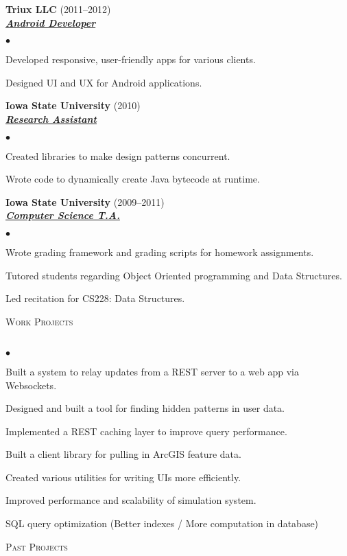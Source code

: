 \documentclass{article}
\newcommand{\lineunder} {
	\vspace*{-8pt} \\ \hspace*{-18pt} \hrulefill \\
}
\newcommand{\header}[1] {
	{\hspace*{-15pt}\vspace*{6pt} \textsc{#1}} \vspace*{-6pt} \lineunder
}
\newcommand{\employer}[3] {
	{ \textbf{#1} (#2)\\ \underline{\textbf{\emph{#3}}}\\  }
}
\newenvironment{achievements} {
	\begin{list}{$\bullet$}
		{\topsep 0pt \itemsep -2pt}
	}{
		\vspace*{4pt}\end{list}
	}
\begin{document}
	\employer{Triux LLC}{2011--2012}{Android Developer}
		\begin{achievements}
			\item{Developed responsive, user-friendly apps for various clients.}
			\item{Designed UI and UX for Android applications.}
		\end{achievements}

	\employer{Iowa State University}{2010}{Research Assistant}
		\begin{achievements}
			\item{Created libraries to make design patterns concurrent.}
			\item{Wrote code to dynamically create Java bytecode at runtime.}
		\end{achievements}

	\employer{Iowa State University}{2009--2011}{Computer Science T.A.}
		\begin{achievements}
			\item{Wrote grading framework and grading scripts for homework assignments.}
			\item{Tutored students regarding Object Oriented programming and Data Structures.}
			\item{Led recitation for CS228: Data Structures.}
		\end{achievements}

\header{Work Projects}

	\begin{achievements}
      \item{Built a system to relay updates from a REST server to a web app via Websockets.}
      \item{Designed and built a tool for finding hidden patterns in user data.}
      \item{Implemented a REST caching layer to improve query performance.}
      \item{Built a client library for pulling in ArcGIS feature data.}
      \item{Created various utilities for writing UIs more efficiently.}
      \item{Improved performance and scalability of simulation system.}
      \item{SQL query optimization (Better indexes / More computation in database)}
   \end{achievements}

\header{Past Projects}
\end{document}
